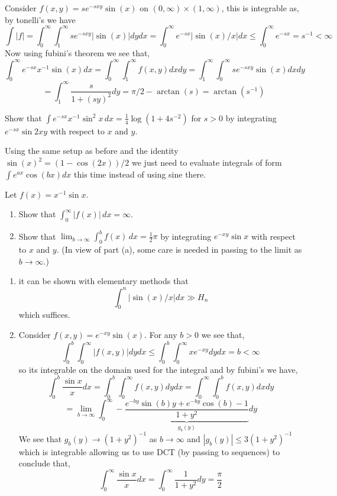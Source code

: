 \documentclass[12pt,a4paper]{article}
\begin{document}
\begin{solution}
	Consider $f(x,y)=se^{-sxy}\sin(x)$ on $(0,\infty)\times(1,\infty)$, this is integrable as, by tonelli's we have
	\[
		\int |f|=\int_0^\infty\int_1^\infty se^{-sxy}|\sin(x)|dydx=\int_0^\infty e^{-sx}|\sin(x)/x|dx\leq\int_0^\infty e^{-sx}=s^{-1}<\infty
	\]
	Now using fubini's theorem we see that,
	\[
		\int_0^\infty e^{-sx}x^{-1}\sin(x)dx=\int_0^\infty\int_1^\infty f(x,y)dxdy=\int_1^\infty\int_0^\infty se^{-sxy}\sin(x)dxdy
	\]
	\[
		=\int_1^\infty \frac{s}{1+(sy)^2}dy=\pi/2-\arctan(s)=\arctan(s^{-1})
	\]
\end{solution}
\begin{problem}\label{prob:2-58}
Show that $\int e^{-sx} x^{-1} \sin^2 x \, dx = \frac{1}{4} \log(1 + 4s^{-2})$ for $s > 0$ by integrating $e^{-sx} \sin 2xy$ with respect to $x$ and $y$.
\end{problem}
\begin{solution}
	Using the same setup as before and the identity $\sin(x)^2=(1-\cos(2x))/2$ we just need to evaluate integrals of form $\int e^{ax}\cos(bx)dx$ this time instead of using sine there.
\end{solution}
\begin{problem}\label{prob:2-59}
Let $f(x) = x^{-1} \sin x$.
\begin{enumerate}[label=\alph*.]
    \item Show that $\int_0^\infty |f(x)| \, dx = \infty$.
    \item Show that $\lim_{b \to \infty} \int_0^b f(x) \, dx = \frac{1}{2}\pi$ by integrating $e^{-xy} \sin x$ with respect to $x$ and $y$. (In view of part (a), some care is needed in passing to the limit as $b \to \infty$.)
\end{enumerate}
\end{problem}
\begin{solution}
    \begin{enumerate}[label=(\alph*)]
		\item it can be shown with elementary methods that 
		\[	
			\int_0^n|\sin(x)/x|dx\gg H_n
		\]
		which suffices.
	\item Consider $f(x,y)=e^{-xy}\sin(x)$. 
		For any $b>0$ we see that,
		\[
			\int_0^b\int_0^\infty| f(x,y)|dydx\leq\int_0^b\int_0^\infty xe^{-xy}dydx=b<\infty
		\]
		so its integrable on the domain used for the integral and by fubini's we have,
		\[
			\int_0^b\frac{\sin x}{x}dx=\int_0^b\int_0^\infty f(x,y)dydx=\int_0^\infty\int_0^bf(x,y)dxdy
		\]
		\[
			=\lim_{b\to\infty}\int_0^\infty- \underbrace{\frac{e^{-by}\sin(b)y+e^{-by}\cos(b)-1}{1+y^2}}_{g_b(y)}dy
		\]
		We see that $g_b(y)\longrightarrow (1+y^2)^{-1}$ as $b\to\infty$ and $|g_b(y)|\leq 3(1+y^2)^{-1}$ which is integrable allowing us to use DCT (by passing to sequences) to conclude that,
		\[
		    \int_0^\infty \frac{\sin x}{x}dx=\int_0^\infty \frac{1}{1+y^2}dy= \frac{\pi}{2}
		\]
    \end{enumerate}
\end{solution}
\end{document}

